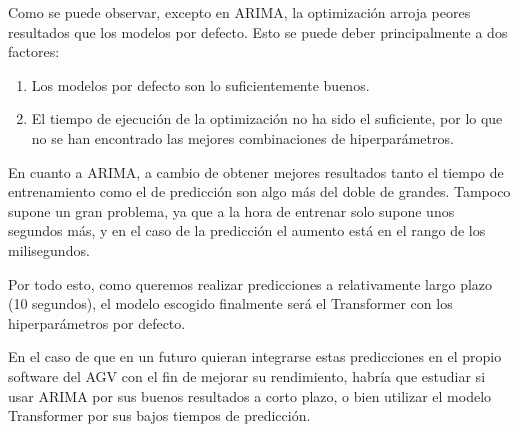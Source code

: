 Como se puede observar, excepto en ARIMA, la optimización arroja peores resultados que los modelos por defecto. Esto 
se puede deber principalmente a dos factores:
\begin{enumerate}
    \item Los modelos por defecto son lo suficientemente buenos.
    \item El tiempo de ejecución de la optimización no ha sido el suficiente, por lo que no se han encontrado las 
        mejores combinaciones de hiperparámetros.
\end{enumerate}

En cuanto a ARIMA, a cambio de obtener mejores resultados tanto el tiempo de entrenamiento como el de predicción 
son algo más del doble de grandes. Tampoco supone un gran problema, ya que a la hora de entrenar solo 
supone unos segundos más, y en el caso de la predicción el aumento está en el rango de los milisegundos.

Por todo esto, como queremos realizar predicciones a relativamente largo plazo (10 segundos), el modelo escogido 
finalmente será el Transformer con los hiperparámetros por defecto.

En el caso de que en un futuro quieran integrarse estas predicciones en el propio software del AGV con el fin 
de mejorar su rendimiento, habría que estudiar si usar ARIMA por sus buenos resultados a corto plazo, o bien 
utilizar el modelo Transformer por sus bajos tiempos de predicción.